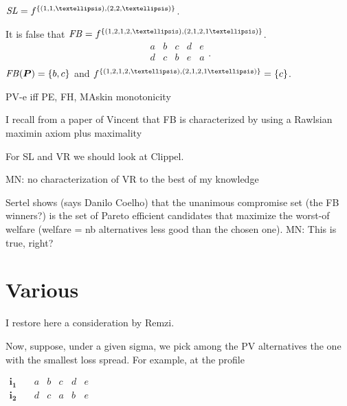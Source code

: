 \documentclass[version=3.21, pagesize, twoside=off, bibliography=totoc, DIV=calc, fontsize=12pt, a4paper]{scrartcl}
\begin{document}
\begin{conjecture}
	\label{th:slVce}
	$\SL = f^{\set{(1, 1, …), (2, 2, …)}}$.
\end{conjecture}

\begin{remark}
	\label{th:fbVce}
	It is false that
	$\FB = f^{\set{(1, 2,1,2, …), (2, 1,2,1 …)}}$.
    \begin{equation}
        \begin{array}{lllll}
                a&b&c&d&e\\
                d&c&b&e&a\\
        \end{array}.
    \end{equation}
    $\mathit{FB}(\bm{P}) = \{b, c\}$ and $f^{\set{(1, 2,1,2, …), (2, 1,2,1 …)}}=\{c\}$.
\end{remark}


PV-e iff PE, FH, MAskin monotonicity

I recall from a paper of Vincent that FB is characterized by using a Rawlsian maximin axiom plus maximality 

For SL and VR we should look at Clippel. 

\color{green} MN: no characterization of VR to the best of my knowledge \color{black}

Sertel shows (says Danilo Coelho) that the unanimous compromise set (the FB winners?) is the set of Pareto efficient candidates that maximize the worst-of welfare (welfare = nb alternatives less good than the chosen one). \color{green} MN: This is true, right? \color{black}


\section{Various}
I restore here a consideration by Remzi.

\begin{remark}[Consideration]
Now, suppose, under a given sigma, we pick among the PV alternatives the one with the smallest loss spread. For example, at the profile 
\begin{center}
	$
	\begin{array}{cccccc}
		\mathbf{i_1} \quad &a&b&c&d&e\\
		\mathbf{i_2} \quad &d&c&a&b&e\\
	\end{array}
	$
\end{center}
\end{remark}
\end{document}
